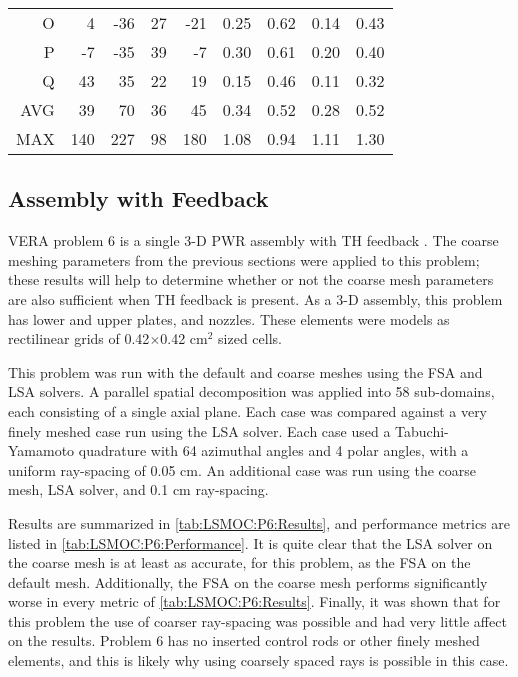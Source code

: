 {{{{\begin{table}
\begin{tabular}{rrrrr@{\hskip 1cm}rrrr}
            O     & 4    &   -36   &  27   &   -21  & 0.25 & 0.62 & 0.14 & 0.43\\
            P     & -7   &   -35   &  39   &   -7   & 0.30 & 0.61 & 0.20 & 0.40\\
            Q     & 43   &   35    &  22   &   19   & 0.15 & 0.46 & 0.11 & 0.32\\\midrule
            AVG   & 39   &   70    &  36   &   45   & 0.34 & 0.52 & 0.28 & 0.52\\
            MAX   & 140  &   227   &  98   &   180  & 1.08 & 0.94 & 1.11 & 1.30\\\bottomrule
          \end{tabular}
          \label{tab:LSMOC:Lattice Results:Coarse Rays}
        \end{table}
      }
    }

    \subsection{Assembly with Feedback}{\label{ssec:LSMOC:Assembly with Feedback}
      \ac{VERA} problem 6 is a single 3-D \ac{PWR} assembly with \ac{TH} feedback \cite{VERAProblems}.
      The coarse meshing parameters from the previous sections were applied to this problem;
        these results will help to determine whether or not the coarse mesh parameters are also sufficient when \ac{TH} feedback is present.
      As a 3-D assembly, this problem has lower and upper plates, and nozzles.
      These elements were models as rectilinear grids of 0.42$\times$0.42 cm$^2$ sized cells.

      This problem was run with the default and coarse meshes using the \ac{FSA} and \ac{LSA} solvers.
      A parallel spatial decomposition was applied into 58 sub-domains, each consisting of a single axial plane.
      Each case was compared against a very finely meshed case run using the \ac{LSA} solver.
      Each case used a Tabuchi-Yamamoto quadrature with 64 azimuthal angles and 4 polar angles, with a uniform ray-spacing of 0.05 cm.
      An additional case was run using the coarse mesh, \ac{LSA} solver, and 0.1 cm ray-spacing.

      Results are summarized in \cref{tab:LSMOC:P6:Results}, and performance metrics are listed in \cref{tab:LSMOC:P6:Performance}.
      It is quite clear that the \ac{LSA} solver on the coarse mesh is at least as accurate, for this problem, as the \ac{FSA} on the default mesh.
      Additionally, the \ac{FSA} on the coarse mesh performs significantly worse in every metric of \cref{tab:LSMOC:P6:Results}.
      Finally, it was shown that for this problem the use of coarser ray-spacing was possible and had very little affect on the results.
      Problem 6 has no inserted control rods or other finely meshed elements, and this is likely why using coarsely spaced rays is possible in this case.

}}}
